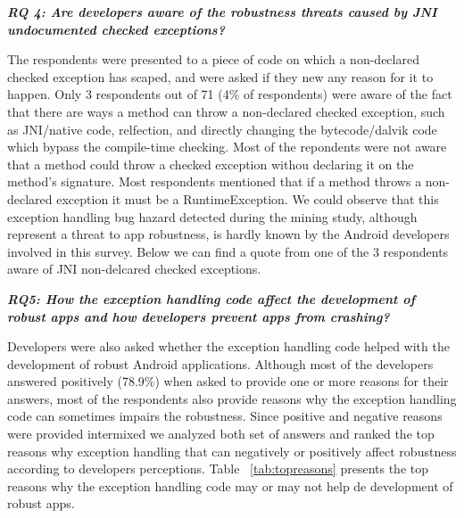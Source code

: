 \bigskip
\noindent\emph{\textbf{RQ 4: Are developers aware of the robustness threats caused by JNI undocumented checked exceptions?}}
\bigskip

The respondents were presented to a piece of code on which a non-declared checked exception has scaped, and were asked if they new any reason for it to happen. Only 3 respondents out of 71 (4\% of respondents) were aware of the fact that there are ways a method can throw a non-declared checked exception, such as JNI/native code, relfection, and directly changing the bytecode/dalvik code which bypass the compile-time checking.  Most of the repondents were not aware that a method could throw a checked exception withou declaring it on the method's signature. Most respondents mentioned that if a method throws a non-declared exception it must be a RuntimeException. We could observe that this exception handling bug hazard detected during the mining study, although represent a threat to app robustness, is hardly known by the Android developers involved in this survey. Below we can find a quote from one of the 3 respondents aware of JNI non-delcared checked exceptions.






\noindent\emph{\textbf{RQ5: How the exception handling code affect the development of robust apps and how developers prevent apps from crashing?}}

\bigskip

Developers were also asked whether the exception handling code helped with the development of robust Android applications. Although most of the developers answered positively (78.9\%) when asked to provide one or more reasons for their answers, most of the respondents also provide reasons why the exception handling code can sometimes impairs the robustness.  Since positive and negative reasons were provided intermixed we analyzed both set of answers and ranked the top reasons why exception handling that can negatively or positively affect robustness according to developers perceptions. Table ~\ref{tab:topreasons} presents the top reasons why the exception handling code may or may not help de development of robust apps. 

